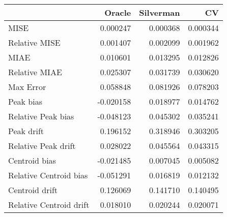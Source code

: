 \begin{tabular}{lrrr}
  \hline
 & Oracle & Silverman & CV \\ 
  \hline
MISE & 0.000247 & 0.000368 & 0.000344 \\ 
  Relative MISE & 0.001407 & 0.002099 & 0.001962 \\ 
  MIAE & 0.010601 & 0.013295 & 0.012826 \\ 
  Relative MIAE & 0.025307 & 0.031739 & 0.030620 \\ 
  Max Error & 0.058848 & 0.081926 & 0.078203 \\ 
  Peak bias & -0.020158 & 0.018977 & 0.014762 \\ 
  Relative Peak bias & -0.048123 & 0.045302 & 0.035241 \\ 
  Peak drift & 0.196152 & 0.318946 & 0.303205 \\ 
  Relative Peak drift & 0.028022 & 0.045564 & 0.043315 \\ 
  Centroid bias & -0.021485 & 0.007045 & 0.005082 \\ 
  Relative Centroid bias & -0.051291 & 0.016819 & 0.012132 \\ 
  Centroid drift & 0.126069 & 0.141710 & 0.140495 \\ 
  Relative Centroid drift & 0.018010 & 0.020244 & 0.020071 \\ 
   \hline
\end{tabular}
